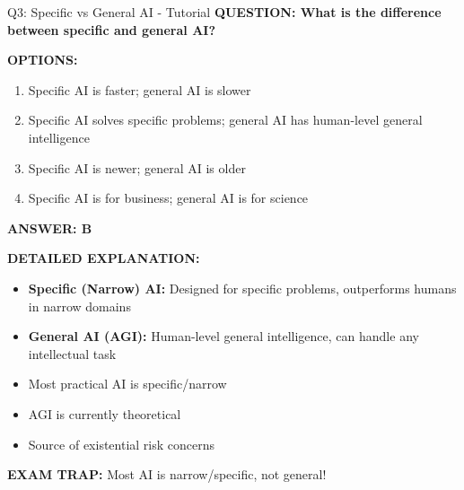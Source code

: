 \documentclass[8pt]{beamer}
\begin{document}
	\begin{frame}{Q3: Specific vs General AI - Tutorial}
		\fontsize{6.5}{7.5}\selectfont
		\textbf{QUESTION: What is the difference between specific and general AI?}
		
		\vspace{0.1cm}
		\textbf{OPTIONS:}
		\begin{enumerate}
			\item Specific AI is faster; general AI is slower
			\item Specific AI solves specific problems; general AI has human-level general intelligence
			\item Specific AI is newer; general AI is older
			\item Specific AI is for business; general AI is for science
		\end{enumerate}
		
		\vspace{0.1cm}
		\textcolor{myblue}{\textbf{ANSWER: B}}
		
		\vspace{0.1cm}
		\textbf{DETAILED EXPLANATION:}
		\begin{itemize}
			\item \textbf{Specific (Narrow) AI:} Designed for specific problems, outperforms humans in narrow domains
			\item \textbf{General AI (AGI):} Human-level general intelligence, can handle any intellectual task
			\item Most practical AI is specific/narrow
			\item AGI is currently theoretical
			\item Source of existential risk concerns
		\end{itemize}
		
		\vspace{0.1cm}
		\textcolor{myred}{\textbf{EXAM TRAP:}} Most AI is \textcolor{myblue}{narrow/specific}, not general!
	\end{frame}
	
\end{document}
